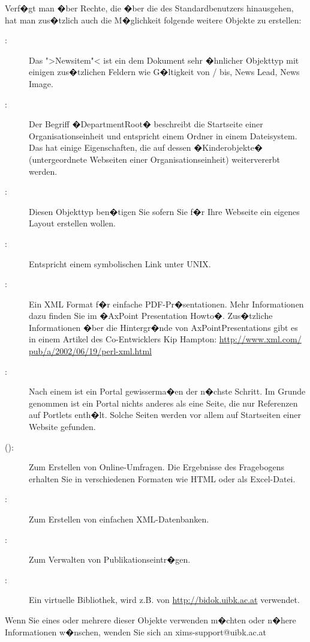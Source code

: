 Verf�gt man �ber Rechte, die �ber die des Standardbenutzers hinausgehen, hat man zus�tzlich auch die M�glichkeit folgende weitere Objekte zu erstellen:
\begin{description}
\item[:] Das ">Newsitem"< ist ein dem Dokument sehr �hnlicher Objekttyp mit einigen zus�tzlichen Feldern wie G�ltigkeit von / bis, News Lead, News Image.
\item[:] Der Begriff �DepartmentRoot� beschreibt die Startseite
einer Organisationseinheit und entspricht einem Ordner in einem Dateisystem.
Das  hat einige Eigenschaften, die auf dessen �Kinderobjekte�
(untergeordnete Webseiten einer Organisationseinheit) weitervererbt werden.
\item[:] Diesen Objekttyp ben�tigen Sie sofern Sie f�r Ihre Webseite ein eigenes Layout erstellen wollen.
\item[:] Entspricht einem symbolischen Link unter UNIX.
\item[:] Ein XML Format f�r einfache PDF-Pr�sentationen.
Mehr Informationen dazu finden Sie im �AxPoint Presentation Howto�.
Zus�tzliche Informationen �ber die Hintergr�nde von AxPointPresentations gibt
es in einem Artikel des  Co-Entwicklers Kip Hampton: \url{http://www.xml.com/
pub/a/2002/06/19/perl-xml.html}
\item[:] Nach einem  ist ein Portal gewisserma�en der n�chste Schritt.
Im Grunde genommen ist ein Portal nichts anderes als eine Seite, die nur
Referenzen auf Portlets enth�lt. Solche Seiten werden vor allem auf Startseiten
einer Website gefunden.
\item[ ():] Zum Erstellen von Online-Umfragen. Die Ergebnisse des Fragebogens erhalten Sie in verschiedenen Formaten wie HTML oder als Excel-Datei.
\item[:] Zum Erstellen von einfachen XML-Datenbanken.
\item[:] Zum Verwalten von Publikationseintr�gen.
\item[:] Ein virtuelle Bibliothek, wird z.B. von \url{http://bidok.uibk.ac.at} verwendet.
\end{description}

Wenn Sie eines oder mehrere dieser Objekte verwenden m�chten oder n�here Informationen w�nschen, wenden Sie sich an xims-support@uibk.ac.at